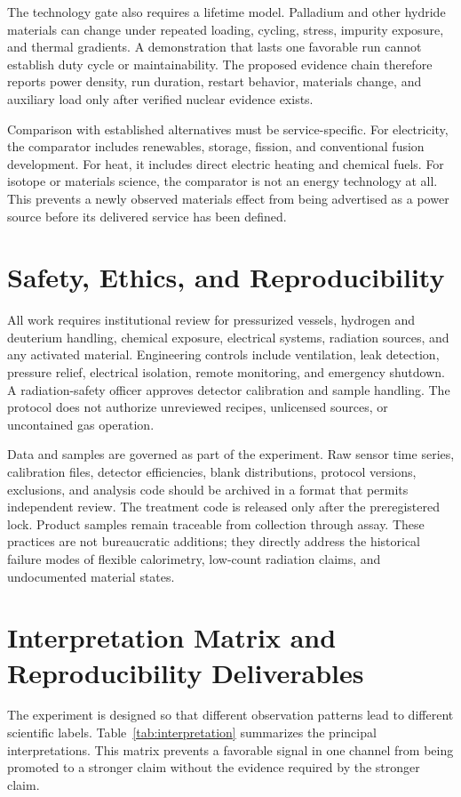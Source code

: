 \documentclass[conference]{IEEEtran}
\begin{document}
The technology gate also requires a lifetime model. Palladium and other hydride materials can change under repeated loading, cycling, stress, impurity exposure, and thermal gradients. A demonstration that lasts one favorable run cannot establish duty cycle or maintainability. The proposed evidence chain therefore reports power density, run duration, restart behavior, materials change, and auxiliary load only after verified nuclear evidence exists.

Comparison with established alternatives must be service-specific. For electricity, the comparator includes renewables, storage, fission, and conventional fusion development. For heat, it includes direct electric heating and chemical fuels. For isotope or materials science, the comparator is not an energy technology at all. This prevents a newly observed materials effect from being advertised as a power source before its delivered service has been defined.

\section{Safety, Ethics, and Reproducibility}
\label{sec:safety}
All work requires institutional review for pressurized vessels, hydrogen and deuterium handling, chemical exposure, electrical systems, radiation sources, and any activated material. Engineering controls include ventilation, leak detection, pressure relief, electrical isolation, remote monitoring, and emergency shutdown. A radiation-safety officer approves detector calibration and sample handling. The protocol does not authorize unreviewed recipes, unlicensed sources, or uncontained gas operation.

Data and samples are governed as part of the experiment. Raw sensor time series, calibration files, detector efficiencies, blank distributions, protocol versions, exclusions, and analysis code should be archived in a format that permits independent review. The treatment code is released only after the preregistered lock. Product samples remain traceable from collection through assay. These practices are not bureaucratic additions; they directly address the historical failure modes of flexible calorimetry, low-count radiation claims, and undocumented material states.

\section{Interpretation Matrix and Reproducibility Deliverables}
\label{sec:interpretation}
The experiment is designed so that different observation patterns lead to different scientific labels. Table~\ref{tab:interpretation} summarizes the principal interpretations. This matrix prevents a favorable signal in one channel from being promoted to a stronger claim without the evidence required by the stronger claim.
\end{document}
